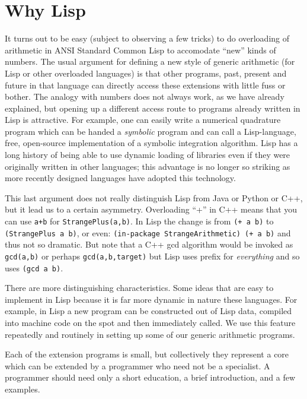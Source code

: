 \documentclass{article}
\begin{document}
\section{Why Lisp}
It turns out to be easy (subject to observing a few tricks) to do
overloading of arithmetic in ANSI Standard Common Lisp to accomodate
``new'' kinds of numbers.  The usual argument for defining a new style
of generic arithmetic (for Lisp or other overloaded languages) is that
other programs, past, present and future in that language can directly
access these extensions with little fuss or bother.  The analogy with
numbers does not always work, as we have already explained, but
opening up a different access route to programs already written in
Lisp is attractive. For example, one can easily write a numerical
quadrature program which can be handed a {\em symbolic} program and
can call a Lisp-language, free, open-source implementation of a
symbolic integration algorithm.  Lisp has a long history of being able
to use dynamic loading of libraries even if they were originally
written in other languages; this advantage is no longer so striking as
more recently designed languages have adopted this technology.

This last argument does not really distinguish Lisp from Java or Python or C++,
but it lead us to a certain asymmetry.
 Overloading ``+'' in C++ means that you can use {\tt a+b} for
{\tt StrangePlus(a,b)}.  In Lisp the change is from {\tt (+ a b)} to
{\tt (StrangePlus a b)}, or even:  {\tt (in-package StrangeArithmetic) (+ a b)}
and thus not so dramatic.  But note that a C++ gcd algorithm would be invoked
as {\tt gcd(a,b)} or perhaps  {\tt gcd(a,b,target)} but Lisp uses prefix for
{\em everything} and so uses {\tt (gcd a b)}. 

There are more distinguishing characteristics.  Some ideas that are
easy to implement in Lisp because it is far more dynamic in nature
these languages. For example, in Lisp a new program can be constructed
out of Lisp data, compiled into machine code on the spot and then
immediately called.  We use this feature repeatedly and routinely in
setting up some of our generic arithmetic programs.

Each of the extension programs is small, but collectively they represent
a core which can be extended by a programmer who need not be a
specialist.  A programmer should need only a short education, a brief
introduction, and a few examples.
\end{document}
